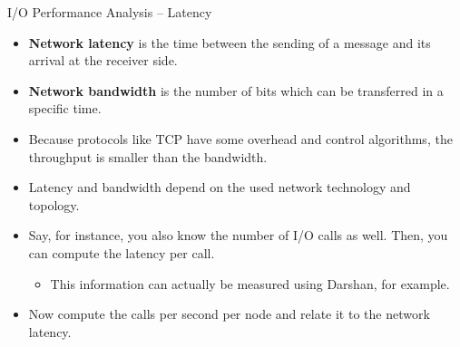 \documentclass[compress,11pt,xcolor=svgnames,aspectratio=169]{beamer}
\begin{document}
\begin{frame}[fragile]{I/O Performance Analysis -- Latency}

\begin{itemize}
\setlength\itemsep{0.3cm}

  \item \textbf{Network latency} is the time between the sending of a message and its arrival at the receiver side.

  \item \textbf{Network bandwidth} is the number of bits which can be transferred in a specific time.

  \item Because protocols like TCP have some overhead and control algorithms, the throughput is smaller than the bandwidth.

  \item Latency and bandwidth depend on the used network technology and topology.

  \item Say, for instance, you also know the number of I/O calls as well. Then, you can compute the latency per call.

    \begin{itemize}
    \setlength\itemsep{0.3cm}
      \item This information can actually be measured using Darshan, for example.
    \end{itemize}

  \item Now compute the calls per second per node and relate it to the network latency.

\end{itemize}

\end{frame}
\end{document}

